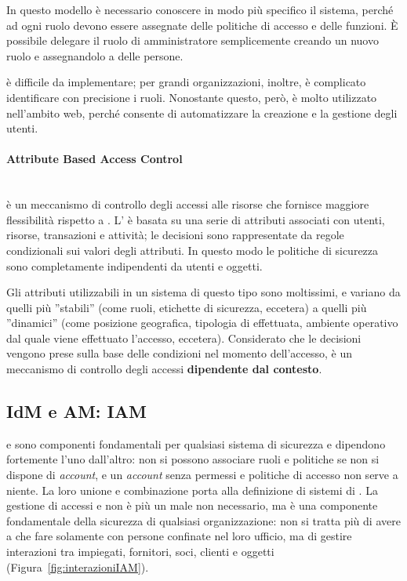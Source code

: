 In questo modello è necessario conoscere in modo più specifico il sistema, perché ad ogni ruolo devono essere assegnate delle politiche di accesso e delle funzioni. È possibile delegare il ruolo di amministratore semplicemente creando un nuovo ruolo e assegnandolo a delle persone.

 è difficile da implementare; per grandi organizzazioni, inoltre, è complicato identificare con precisione i ruoli. Nonostante questo, però, è molto utilizzato nell'ambito web, perché consente di automatizzare la creazione e la gestione degli utenti. 

\paragraph{Attribute Based Access Control} \mbox{} \\
 è un meccanismo di controllo degli accessi alle risorse che fornisce maggiore flessibilità rispetto a . L' è basata su una serie di attributi associati con utenti, risorse, transazioni e attività; le decisioni sono rappresentate da regole condizionali sui valori degli attributi. In questo modo le politiche di sicurezza sono completamente indipendenti da utenti e oggetti.

Gli attributi utilizzabili in un sistema di questo tipo sono moltissimi, e variano da quelli più ''stabili'' (come ruoli, etichette di sicurezza, eccetera) a quelli più ''dinamici'' (come posizione geografica, tipologia di  effettuata, ambiente operativo dal quale viene effettuato l'accesso, eccetera). Considerato che le decisioni vengono prese sulla base delle condizioni nel momento dell'accesso,  è un meccanismo di controllo degli accessi \textbf{dipendente dal contesto}.

\subsection{IdM e AM: IAM}
 e  sono componenti fondamentali per qualsiasi sistema di sicurezza e dipendono fortemente l'uno dall'altro: non si possono associare ruoli e politiche se non si dispone di \textit{account}, e un \textit{account} senza permessi e politiche di accesso non serve a niente. La loro unione e combinazione porta alla definizione di sistemi di . La gestione di accessi e  non è più un male non necessario, ma è una componente fondamentale della sicurezza di qualsiasi organizzazione: non si tratta più di avere a che fare solamente con persone confinate nel loro ufficio, ma di gestire interazioni tra impiegati, fornitori, soci, clienti e oggetti (Figura~\ref{fig:interazioniIAM}). 

